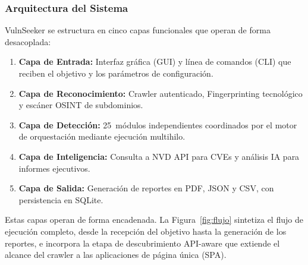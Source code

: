 \documentclass[12pt, a4paper]{article}
\begin{document}
\subsubsection{Arquitectura del Sistema}

VulnSeeker se estructura en cinco capas funcionales que operan de forma
desacoplada:

\begin{enumerate}
    \item \textbf{Capa de Entrada:} Interfaz gráfica (GUI) y línea de
    comandos (CLI) que reciben el objetivo y los parámetros de configuración.

    \item \textbf{Capa de Reconocimiento:} Crawler autenticado,
    Fingerprinting tecnológico y escáner OSINT de subdominios.

    \item \textbf{Capa de Detección:} 25~módulos independientes coordinados
    por el motor de orquestación mediante ejecución multihilo.

    \item \textbf{Capa de Inteligencia:} Consulta a NVD API para CVEs y
    análisis IA para informes ejecutivos.

    \item \textbf{Capa de Salida:} Generación de reportes en PDF, JSON y
    CSV, con persistencia en SQLite.
\end{enumerate}

Estas capas operan de forma encadenada. La Figura~\ref{fig:flujo} sintetiza el
flujo de ejecución completo, desde la recepción del objetivo hasta la generación
de los reportes, e incorpora la etapa de descubrimiento API-aware que extiende el
alcance del crawler a las aplicaciones de página única (SPA).
\end{document}
